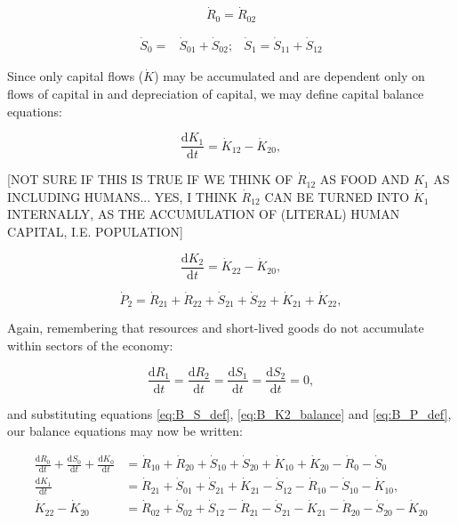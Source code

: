 \begin{equation}
	\dot{R}_{0} = \dot{R}_{02}
\end{equation}

\begin{align}\label{eq:B_S_def}
	\dot{S}_{0} = 
	& \dot{S}_{01} + \dot{S}_{02};
	& \dot{S}_{1} = 
	\dot{S}_{11} + \dot{S}_{12}
\end{align}

Since only capital flows ($\dot{K}$) may be accumulated and are dependent only on flows of capital in and depreciation of capital, we may define capital balance equations:

\begin{equation} \label{eq:B_K1_balance}
	\frac{\mathrm{d}K_{1}}{\mathrm{d}t}
	=  \dot{K}_{12} - \dot{K}_{20},
\end{equation}

[NOT SURE IF THIS IS TRUE IF WE THINK OF $\dot{R}_{12}$ AS FOOD AND $K_{1}$ AS INCLUDING HUMANS... YES, I THINK $\dot{R}_{12}$ CAN BE TURNED INTO  $\dot{K}_{1}$ INTERNALLY, AS THE ACCUMULATION OF (LITERAL) HUMAN CAPITAL, I.E. POPULATION]

\begin{equation} \label{eq:B_K2_balance}
	\frac{\mathrm{d}K_{2}}{\mathrm{d}t}
	=  \dot{K}_{22} - \dot{K}_{20},
\end{equation}

\begin{equation} \label{eq:B_P_def}
	\dot{P}_{2}
	= \dot{R}_{21}
	+ \dot{R}_{22}
	+ \dot{S}_{21}
	+ \dot{S}_{22}
	+ \dot{K}_{21}	 
	+ \dot{K}_{22},
\end{equation}


\noindent Again, remembering that resources and short-lived
goods do not accumulate within sectors of the economy:

\begin{equation}\label{eq:dR_and_dS_zero}
	\frac{\mathrm{d}R_{1}}{\mathrm{d}t}
	= \frac{\mathrm{d}R_{2}}{\mathrm{d}t} 
	= \frac{\mathrm{d}S_{1}}{\mathrm{d}t} 
	= \frac{\mathrm{d}S_{2}}{\mathrm{d}t} 
	= 0,
\end{equation}

\noindent and substituting equations \ref{eq:B_S_def},
\ref{eq:B_K2_balance}  and \ref{eq:B_P_def}, our balance 
equations may now be written:


\begin{align} \label{eq:B_CV_0_to_2_b}
	\frac{\mathrm{d}R_{0}}{\mathrm{d}t} 
	+ \frac{\mathrm{d}S_{0}}{\mathrm{d}t}	
	+ \frac{\mathrm{d}K_0}{\mathrm{d}t}		
	& = \dot{R}_{10} + \dot{R}_{20} 
	+ \dot{S}_{10} + \dot{S}_{20} 
	+ \dot{K}_{10} + \dot{K}_{20} 
	- \dot{R}_{0} 
	- \dot{S}_{0} 							\\
	\frac{\mathrm{d}K_{1}}{\mathrm{d}t}	
	& = \dot{R}_{21} 
	+ \dot{S}_{01} 
	+ \dot{S}_{21}
	+ \dot{K}_{21}
	- \dot{S}_{12} 
	- \dot{R}_{10} 
	- \dot{S}_{10} 
	- \dot{K}_{10},							\\
	\dot{K}_{22} - \dot{K}_{20}	
	& = \dot{R}_{02} 
	+ \dot{S}_{02} 
	+ \dot{S}_{12} 
	- \dot{R}_{21}
	- \dot{S}_{21}
	- \dot{K}_{21}
	- \dot{R}_{20} 
	- \dot{S}_{20} 
	- \dot{K}_{20}							\\
\end{align}





